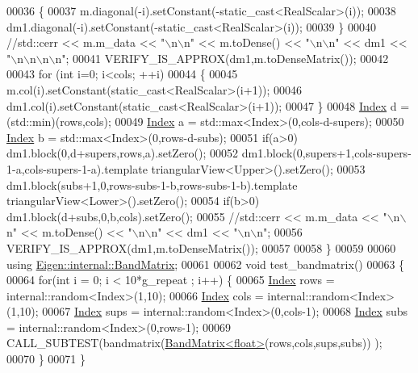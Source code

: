 \begin{DoxyCode}
00036   \{
00037     m.diagonal(-i).setConstant(-static\_cast<RealScalar>(i));
00038     dm1.diagonal(-i).setConstant(-static\_cast<RealScalar>(i));
00039   \}
00040   \textcolor{comment}{//std::cerr << m.m\_data << "\(\backslash\)n\(\backslash\)n" << m.toDense() << "\(\backslash\)n\(\backslash\)n" << dm1 << "\(\backslash\)n\(\backslash\)n\(\backslash\)n\(\backslash\)n";}
00041   VERIFY\_IS\_APPROX(dm1,m.toDenseMatrix());
00042 
00043   \textcolor{keywordflow}{for} (\textcolor{keywordtype}{int} i=0; i<cols; ++i)
00044   \{
00045     m.col(i).setConstant(static\_cast<RealScalar>(i+1));
00046     dm1.col(i).setConstant(static\_cast<RealScalar>(i+1));
00047   \}
00048   \hyperlink{namespace_eigen_a62e77e0933482dafde8fe197d9a2cfde}{Index} d = (std::min)(rows,cols);
00049   \hyperlink{namespace_eigen_a62e77e0933482dafde8fe197d9a2cfde}{Index} a = std::max<Index>(0,cols-d-supers);
00050   \hyperlink{namespace_eigen_a62e77e0933482dafde8fe197d9a2cfde}{Index} b = std::max<Index>(0,rows-d-subs);
00051   \textcolor{keywordflow}{if}(a>0) dm1.block(0,d+supers,rows,a).setZero();
00052   dm1.block(0,supers+1,cols-supers-1-a,cols-supers-1-a).template triangularView<Upper>().setZero();
00053   dm1.block(subs+1,0,rows-subs-1-b,rows-subs-1-b).template triangularView<Lower>().setZero();
00054   \textcolor{keywordflow}{if}(b>0) dm1.block(d+subs,0,b,cols).setZero();
00055   \textcolor{comment}{//std::cerr << m.m\_data << "\(\backslash\)n\(\backslash\)n" << m.toDense() << "\(\backslash\)n\(\backslash\)n" << dm1 << "\(\backslash\)n\(\backslash\)n";}
00056   VERIFY\_IS\_APPROX(dm1,m.toDenseMatrix());
00057 
00058 \}
00059 
00060 \textcolor{keyword}{using} \hyperlink{group___core___module_class_eigen_1_1internal_1_1_band_matrix}{Eigen::internal::BandMatrix};
00061 
00062 \textcolor{keywordtype}{void} test\_bandmatrix()
00063 \{
00064   \textcolor{keywordflow}{for}(\textcolor{keywordtype}{int} i = 0; i < 10*g\_repeat ; i++) \{
00065     \hyperlink{namespace_eigen_a62e77e0933482dafde8fe197d9a2cfde}{Index} rows = internal::random<Index>(1,10);
00066     \hyperlink{namespace_eigen_a62e77e0933482dafde8fe197d9a2cfde}{Index} cols = internal::random<Index>(1,10);
00067     \hyperlink{namespace_eigen_a62e77e0933482dafde8fe197d9a2cfde}{Index} sups = internal::random<Index>(0,cols-1);
00068     \hyperlink{namespace_eigen_a62e77e0933482dafde8fe197d9a2cfde}{Index} subs = internal::random<Index>(0,rows-1);
00069     CALL\_SUBTEST(bandmatrix(\hyperlink{group___core___module_class_eigen_1_1internal_1_1_band_matrix}{BandMatrix<float>}(rows,cols,sups,subs)) );
00070   \}
00071 \}
\end{DoxyCode}
